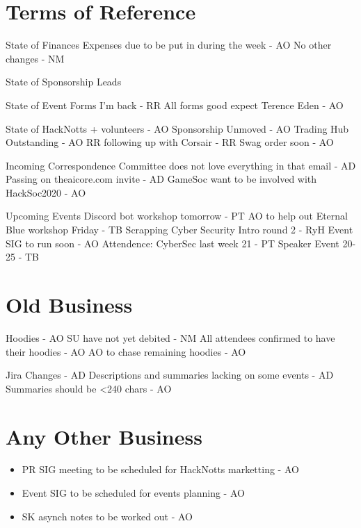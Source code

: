 \documentclass[11pt,hacksoc]{meetingmins}
\begin{document}
\maketitle


\section{Terms of Reference}
\begin{items}
\item {State of Finances}
  \subitem Expenses due to be put in during the week - AO
  \subitem No other changes - NM
\item {State of Sponsorship Leads}
\item {State of Event Forms}
  \subitem I'm back - RR
  \subitem All forms good expect Terence Eden - AO
\item {State of HackNotts}
  + volunteers - AO
  \subitem Sponsorship Unmoved - AO
    \subsubitem Trading Hub Outstanding - AO
    \subsubitem RR following up with Corsair - RR
  \subitem Swag order soon - AO
\item {Incoming Correspondence}
  \subitem Committee does not love everything in that email - AD
    \subsubitem Passing on theaicore.com invite - AD
  \subitem GameSoc want to be involved with HackSoc2020 - AO
\item {Upcoming Events}
  \subitem Discord bot workshop tomorrow - PT
    \subsubitem AO to help out
  \subitem Eternal Blue workshop Friday - TB
  \subitem Scrapping Cyber Security Intro round 2 - RyH
  \subitem Event SIG to run soon - AO
  \subitem Attendence:
    \subsubitem CyberSec last week 21 - PT
    \subsubitem Speaker Event 20-25 - TB
\end{items}

\section{Old Business}
\begin{items}
\item Hoodies - AO
  \subitem SU have not yet debited - NM
  \subitem All attendees confirmed to have their hoodies - AO
  \subitem AO to chase remaining hoodies - AO
\item Jira Changes - AD
  \subitem Descriptions and summaries lacking on some events - AD
  \subitem Summaries should be <240 chars - AO
\end{items}  

\section{Any Other Business}
\begin{itemize}
\item PR SIG meeting to be scheduled for HackNotts marketting - AO
\item Event SIG to be scheduled for events planning - AO
\item SK asynch notes to be worked out - AO
\end{itemize}

\vspace{1em}
\end{document}
